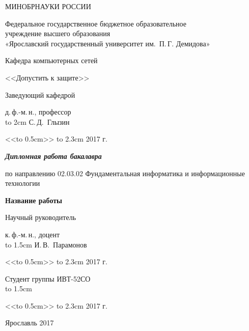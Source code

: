 \thispagestyle{empty}

\enlargethispage{2cm}
{
\renewcommand{\baselinestretch}{1.25}
\selectfont

\begin{center}
МИНОБРНАУКИ РОССИИ

Федеральное государственное бюджетное образовательное\\ учреждение
высшего образования\\
«Ярославский государственный университет им.~П.\,Г. Демидова»

Кафедра компьютерных сетей

\vspace{1.5cm}

\hfill\parbox{6.5cm}
{ 
<<Допустить к защите>>

Заведующий кафедрой

д.\,ф.-м.\,н., профессор \\
\hbox to 2cm{\hrulefill} С.\,Д.~Глызин

<<\hbox to 0.5cm{\hrulefill}>> \hbox to 2.3cm{\hrulefill} 2017 г.
}

\vspace{1.5cm}

{\bf \em Дипломная работа бакалавра}
\par по направлению 02.03.02 Фундаментальная информатика и информационные технологии



\vspace{0.5cm}

{ \large \bf \selectfont Название работы
  
}

\vspace{3cm}


\hfill\parbox{6.5cm}
{ 
Научный руководитель

к.\,ф.-м.\,н., доцент\\
\hbox to 1.5cm{\hrulefill} И.\,В.~Парамонов

<<\hbox to 0.5cm{\hrulefill}>> \hbox to 2.3cm{\hrulefill} 2017 г.
}

\vspace{1.5cm}

\hfill\parbox{6.5cm}
{ 
Студент группы ИВТ-52СО\\
\hbox to 1.5cm{\hrulefill}

<<\hbox to 0.5cm{\hrulefill}>> \hbox to 2.3cm{\hrulefill} 2017 г.
}

\vspace{2cm}

Ярославль 2017
 
\end{center}
}

\newpage

